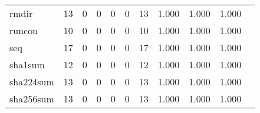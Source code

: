 \begin{longtable}{lp{1.2cm}p{1.2cm}p{1.2cm}p{1.2cm}p{1.2cm}p{1.2cm}p{1.2cm}p{1.2cm}p{1.2cm}p{1.2cm}}
rmdir     &                                    13 &                                                  0 &                                                  0 &                                                  0 &                                                  0 &                                                 13 &                                              1.000 &                                              1.000 &                                              1.000 \\
runcon    &                                    10 &                                                  0 &                                                  0 &                                                  0 &                                                  0 &                                                 10 &                                              1.000 &                                              1.000 &                                              1.000 \\
seq       &                                    17 &                                                  0 &                                                  0 &                                                  0 &                                                  0 &                                                 17 &                                              1.000 &                                              1.000 &                                              1.000 \\
sha1sum   &                                    12 &                                                  0 &                                                  0 &                                                  0 &                                                  0 &                                                 12 &                                              1.000 &                                              1.000 &                                              1.000 \\
sha224sum &                                    13 &                                                  0 &                                                  0 &                                                  0 &                                                  0 &                                                 13 &                                              1.000 &                                              1.000 &                                              1.000 \\
sha256sum &                                    13 &                                                  0 &                                                  0 &                                                  0 &                                                  0 &                                                 13 &                                              1.000 &                                              1.000 &                                              1.000 \\

\end{longtable}
